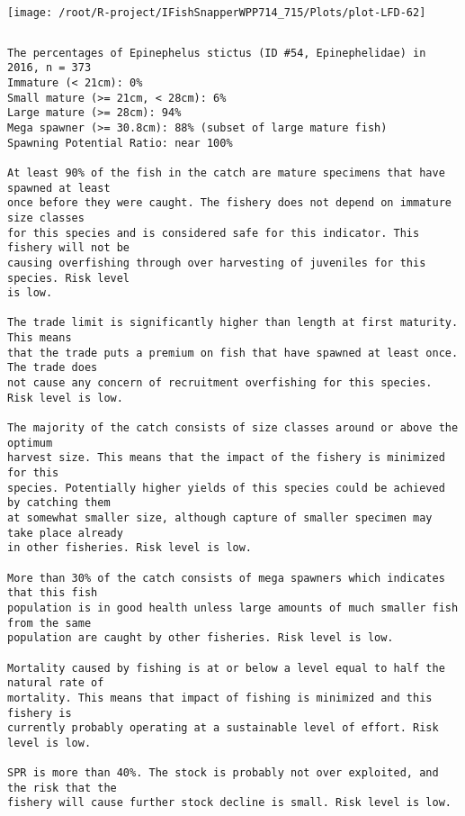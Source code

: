 \documentclass{report}\usepackage[]{graphicx}\usepackage[]{color}
\makeatletter
\def\maxwidth{ %
  \ifdim\Gin@nat@width>\linewidth
    \linewidth
  \else
    \Gin@nat@width
  \fi
}
\newenvironment{kframe}{%
 \def\at@end@of@kframe{}%
 \ifinner\ifhmode%
  \def\at@end@of@kframe{\end{minipage}}%
  \begin{minipage}{\columnwidth}%
 \fi\fi%
 \def\FrameCommand##1{\hskip\@totalleftmargin \hskip-\fboxsep
 \colorbox{shadecolor}{##1}\hskip-\fboxsep
     \hskip-\linewidth \hskip-\@totalleftmargin \hskip\columnwidth}%
 \MakeFramed {\advance\hsize-\width
   \@totalleftmargin\z@ \linewidth\hsize
   \@setminipage}}%
 {\par\unskip\endMakeFramed%
 \at@end@of@kframe}
\newenvironment{knitrout}{}{} %
\makeatother
\begin{document}
\begin{knitrout}
\texttt{[image: /root/R-project/IFishSnapperWPP714\_715/Plots/plot-LFD-62]} 
\begin{kframe}\begin{verbatim}
\end{verbatim}
\end{kframe}
\clearpage
\newpage
\begin{kframe}\begin{verbatim}The percentages of Epinephelus stictus (ID #54, Epinephelidae) in 2016, n = 373
Immature (< 21cm): 0%
Small mature (>= 21cm, < 28cm): 6%
Large mature (>= 28cm): 94%
Mega spawner (>= 30.8cm): 88% (subset of large mature fish)
Spawning Potential Ratio: near 100%
 
At least 90% of the fish in the catch are mature specimens that have spawned at least
once before they were caught. The fishery does not depend on immature size classes
for this species and is considered safe for this indicator. This fishery will not be
causing overfishing through over harvesting of juveniles for this species. Risk level
is low.

The trade limit is significantly higher than length at first maturity.  This means
that the trade puts a premium on fish that have spawned at least once. The trade does
not cause any concern of recruitment overfishing for this species. Risk level is low.

The majority of the catch consists of size classes around or above the optimum
harvest size. This means that the impact of the fishery is minimized for this
species. Potentially higher yields of this species could be achieved by catching them
at somewhat smaller size, although capture of smaller specimen may take place already
in other fisheries. Risk level is low.

More than 30% of the catch consists of mega spawners which indicates that this fish
population is in good health unless large amounts of much smaller fish from the same
population are caught by other fisheries. Risk level is low.
 
Mortality caused by fishing is at or below a level equal to half the natural rate of
mortality. This means that impact of fishing is minimized and this fishery is
currently probably operating at a sustainable level of effort. Risk level is low.
 
SPR is more than 40%. The stock is probably not over exploited, and the risk that the
fishery will cause further stock decline is small. Risk level is low.
 

\end{verbatim}
\end{kframe}
\end{knitrout}
\end{document}
